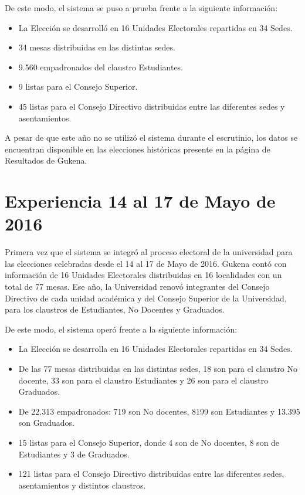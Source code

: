 De este modo, el sistema se puso a prueba frente a la siguiente información:
\begin{itemize}
    \item La Elección se desarrolló en 16 Unidades Electorales repartidas en 34 Sedes.
    \item 34 mesas distribuidas en las distintas sedes.
    \item 9.560 empadronados del claustro Estudiantes.
    \item 9 listas para el Consejo Superior.
    \item 45 listas para el Consejo Directivo distribuidas entre las diferentes sedes y asentamientos.
\end{itemize}

A pesar de que este año no se utilizó el sistema durante el escrutinio, los datos se encuentran disponible en las elecciones históricas presente en la página de Resultados de Gukena.

\section{Experiencia 14 al 17 de Mayo de 2016}
\label{exp2016}
Primera vez que el sistema se integró al proceso electoral de la universidad para las elecciones celebradas desde el 14 al 17 de Mayo de 2016. Gukena contó con información de 16 Unidades Electorales distribuidas en 16 localidades con un total de 77 mesas. 
Ese año, la Universidad renovó integrantes del Consejo Directivo de cada unidad académica y del Consejo Superior de la Universidad, para los claustros de Estudiantes, No Docentes y Graduados. 

De este modo, el sistema operó frente a la siguiente información:
\begin{itemize}
    \item La Elección se desarrolla en 16 Unidades Electorales repartidas en 34 Sedes.
    \item De las 77 mesas distribuidas en las distintas sedes, 18 son para el claustro No docente, 33 son para el claustro Estudiantes y 26 son para el claustro Graduados.
    \item De 22.313 empadronados: 719 son No docentes, 8199 son Estudiantes y 13.395 son Graduados. 
    \item 15 listas para el Consejo Superior, donde 4 son de No docentes, 8 son de Estudiantes y 3 de Graduados.
    \item 121 listas para el Consejo Directivo distribuidas entre las diferentes sedes, asentamientos y distintos claustros.
\end{itemize}

